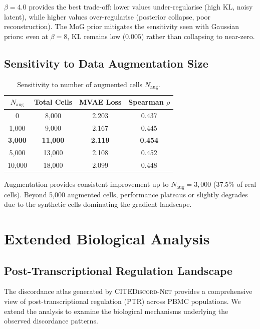 \documentclass[11pt,a4paper]{article}
\newcommand{\citenet}{\textsc{CITEDiscord-Net}}
\begin{document}
$\beta=4.0$ provides the best trade-off: lower values under-regularise (high KL, noisy latent), while higher values over-regularise (posterior collapse, poor reconstruction).
The MoG prior mitigates the sensitivity seen with Gaussian priors: even at $\beta=8$, KL remains low ($0.005$) rather than collapsing to near-zero.

\subsection{Sensitivity to Data Augmentation Size}

\begin{table}[!ht]
\centering
\caption{Sensitivity to number of augmented cells $N_\text{aug}$.}
\label{tab:aug_sens}
\scriptsize
\begin{tabular}{c c c c}
\toprule
$N_\text{aug}$ & Total Cells & MVAE Loss & Spearman $\rho$ \\
\midrule
0 & 8,000 & 2.203 & 0.437 \\
1,000 & 9,000 & 2.167 & 0.445 \\
\textbf{3,000} & \textbf{11,000} & \textbf{2.119} & \textbf{0.454} \\
5,000 & 13,000 & 2.108 & 0.452 \\
10,000 & 18,000 & 2.099 & 0.448 \\
\bottomrule
\end{tabular}
\end{table}

Augmentation provides consistent improvement up to $N_\text{aug}=3{,}000$ (37.5\% of real cells).
Beyond 5,000 augmented cells, performance plateaus or slightly degrades due to the synthetic cells dominating the gradient landscape.

\section{Extended Biological Analysis}\label{sec:bio_analysis}

\subsection{Post-Transcriptional Regulation Landscape}

The discordance atlas generated by \citenet{} provides a comprehensive view of post-transcriptional regulation (PTR) across PBMC populations.
We extend the analysis to examine the biological mechanisms underlying the observed discordance patterns.
\end{document}

